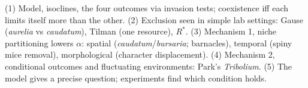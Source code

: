 \begin{longans}
(1) Model, isoclines, the four outcomes via invasion tests; coexistence iff each limits itself more than the other.
(2) Exclusion seen in simple lab settings: Gause (\emph{aurelia} vs \emph{caudatum}), Tilman (one resource), $R^*$.
(3) Mechanism 1, niche partitioning lowers $\alpha$: spatial (\emph{caudatum}/\emph{bursaria}; barnacles), temporal
(spiny mice removal), morphological (character displacement). (4) Mechanism 2, conditional outcomes and fluctuating
environments: Park's \emph{Tribolium}. (5) The model gives a precise question; experiments find which condition holds.
\end{longans}
